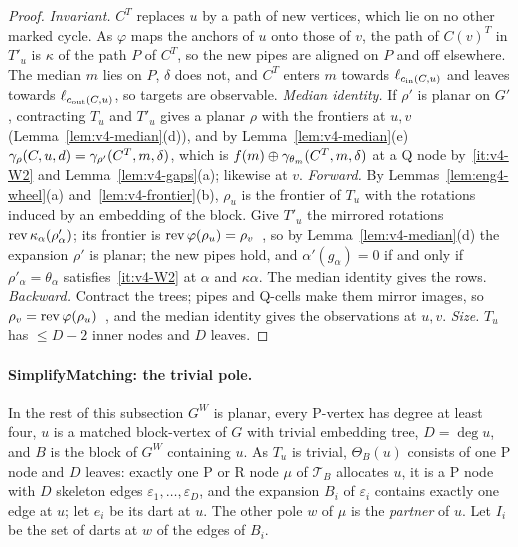 \begin{proof}
\emph{Invariant.} $C^T$ replaces $u$ by a path of new vertices, which lie on
no other marked cycle. As $\varphi$ maps the anchors of $u$ onto those of
$v$, the path of $C(v)^T$ in $T'_u$ is $\kappa$ of the path $P$ of $C^T$, so
the new pipes are aligned on $P$ and off elsewhere. The median $m$ lies on
$P$, $\delta$ does not, and $C^T$ enters $m$ towards $\ell_{c_{\mathrm{in}}(C,u)}$ and
leaves towards $\ell_{c_{\mathrm{out}}(C,u)}$, so targets are observable.
\emph{Median identity.} If $\rho'$ is planar on $G'$, contracting $T_u$ and
$T'_u$ gives a planar $\rho$ with the frontiers at $u,v$
(Lemma~\ref{lem:v4-median}(d)), and by Lemma~\ref{lem:v4-median}(e)
$\gamma_\rho(C,u,d)=\gamma_{\rho'}(C^T,m,\delta)$, which is
$f(m)\oplus\gamma_{\theta_m}(C^T,m,\delta)$ at a Q node by~\ref{it:v4-W2} and
Lemma~\ref{lem:v4-gaps}(a); likewise at $v$.
\emph{Forward.} By Lemmas~\ref{lem:eng4-wheel}(a)
and~\ref{lem:v4-frontier}(b), $\rho_u$ is the frontier of $T_u$ with the
rotations induced by an embedding of the block. Give $T'_u$ the mirrored
rotations $\operatorname{rev}\kappa_\alpha(\rho'_\alpha)$; its frontier is
$\operatorname{rev}\varphi(\rho_u)=\rho_v$~\cite[proof of Lemma~5]{BFR21}, so by
Lemma~\ref{lem:v4-median}(d) the expansion $\rho'$ is planar; the new pipes
hold, and $\alpha'(g_\alpha)=0$ if and only if $\rho'_\alpha=\theta_\alpha$
satisfies~\ref{it:v4-W2} at $\alpha$ and $\kappa\alpha$. The median
identity gives the rows. \emph{Backward.} Contract the trees; pipes and
Q-cells make them mirror images, so $\rho_v=\operatorname{rev}\varphi(\rho_u)$~\cite[proof
of Lemma~5]{BFR21}, and the median identity gives the observations at $u,v$.
\emph{Size.} $T_u$ has $\le D-2$ inner nodes and $D$ leaves.
\end{proof}

\paragraph{SimplifyMatching: the trivial pole.} In the rest of this
subsection $G^W$ is planar, every P-vertex has degree at least four, $u$ is a
matched block-vertex of $G$ with trivial embedding tree, $D=\deg u$, and $B$
is the block of $G^W$ containing $u$. As $T_u$ is trivial, $\Theta_B(u)$
consists of one P node and $D$ leaves: exactly one P or R node $\mu$ of
$\mathcal T_B$ allocates $u$, it is a P node with $D$ skeleton edges
$\varepsilon_1,\dots,\varepsilon_D$, and the expansion $B_i$ of
$\varepsilon_i$ contains exactly one edge at $u$; let $e_i$ be its dart at
$u$. The other pole $w$ of $\mu$ is the \emph{partner} of $u$. Let $I_i$ be
the set of darts at $w$ of the edges of $B_i$.

